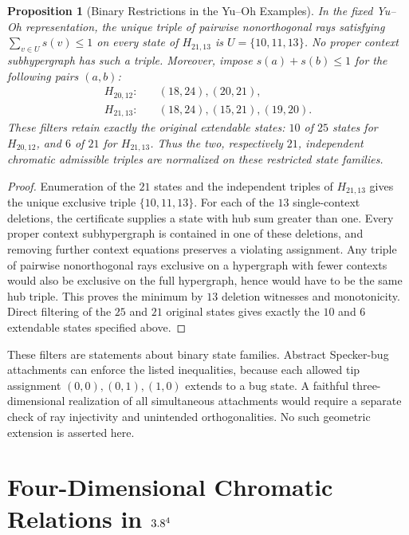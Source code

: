 \documentclass[aps,pra,reprint,superscriptaddress,longbibliography,nofootinbib,floatfix,10pt]{revtex4-2}
\newtheorem{proposition}[theorem]{Proposition}
\theoremstyle{definition}\newtheorem{definition}[theorem]{Definition}
\theoremstyle{remark}\newtheorem{remark}[theorem]{Remark}
\begin{document}
\begin{proposition}[Binary Restrictions in the Yu--Oh Examples]\label{prop:yo-binary-filters}
In the fixed Yu--Oh representation, the unique triple of pairwise nonorthogonal rays satisfying $\sum_{v\in U}s(v)\le1$ on every state of $H_{21,13}$ is $U=\{10,11,13\}$. No proper context subhypergraph has such a triple. Moreover, impose $s(a)+s(b)\le1$ for the following pairs $(a,b)$:
\begin{equation}\label{eq:yo-binary-filters}
\begin{aligned}
H_{20,12}:&\quad (18,24),(20,21),\\
H_{21,13}:&\quad (18,24),(15,21),(19,20).
\end{aligned}
\end{equation}
These filters retain exactly the original extendable states: $10$ of $25$ states for $H_{20,12}$, and $6$ of $21$ for $H_{21,13}$. Thus the two, respectively $21$, independent chromatic admissible triples are normalized on these restricted state families.
\end{proposition}
\begin{proof}
Enumeration of the $21$ states and the independent triples of $H_{21,13}$ gives the unique exclusive triple $\{10,11,13\}$. For each of the $13$ single-context deletions, the certificate supplies a state with hub sum greater than one. Every proper context subhypergraph is contained in one of these deletions, and removing further context equations preserves a violating assignment. Any triple of pairwise nonorthogonal rays exclusive on a hypergraph with fewer contexts would also be exclusive on the full hypergraph, hence would have to be the same hub triple. This proves the minimum by $13$ deletion witnesses and monotonicity. Direct filtering of the $25$ and $21$ original states gives exactly the $10$ and $6$ extendable states specified above.
\end{proof}

These filters are statements about binary state families. Abstract Specker-bug attachments can enforce the listed inequalities, because each allowed tip assignment $(0,0),(0,1),(1,0)$ extends to a bug state. A faithful three-dimensional realization of all simultaneous attachments would require a separate check of ray injectivity and unintended orthogonalities. No such geometric extension is asserted here.


\section{Four-Dimensional Chromatic Relations in \texorpdfstring{$3.8^4$}{R4}}\label{sec:4d}
\end{document}
